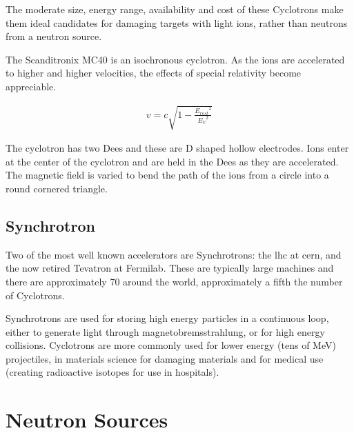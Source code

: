 The moderate size, energy range, availability and cost of these Cyclotrons make them ideal candidates for damaging targets with light ions, rather than neutrons from a neutron source.

The Scanditronix MC40 is an isochronous cyclotron.  As the ions are accelerated to higher and higher velocities, the effects of special relativity become appreciable.

\begin{equation}
\begin{split}
v = c \sqrt{1 - \frac{{E_{rest}}^2}{{E_V}^2}}
\end{split}
\label{eq:eqGammaFunction}
\end{equation}

The cyclotron has two Dees and these are D shaped hollow electrodes.  Ions enter at the center of the cyclotron and are held in the Dees as they are accelerated.  The magnetic field is varied to bend the path of the ions from a circle into a round cornered triangle.




\FloatBarrier
\subsection{Synchrotron}

Two of the most well known accelerators are Synchrotrons: the \acrlong{lhc} at \acrlong{cern}, and the now retired Tevatron at Fermilab.  These are typically large machines and there are approximately 70 around the world\cite{synchrotrons}, approximately a fifth the number of Cyclotrons.  

Synchrotrons are used for storing high energy particles in a continuous loop, either to generate light through magnetobremsstrahlung, or for high energy collisions.  Cyclotrons are more commonly used for lower energy (tens of MeV) projectiles, in materials science for damaging materials and for medical use (creating radioactive isotopes for use in hospitals).












\FloatBarrier
\section{Neutron Sources}

